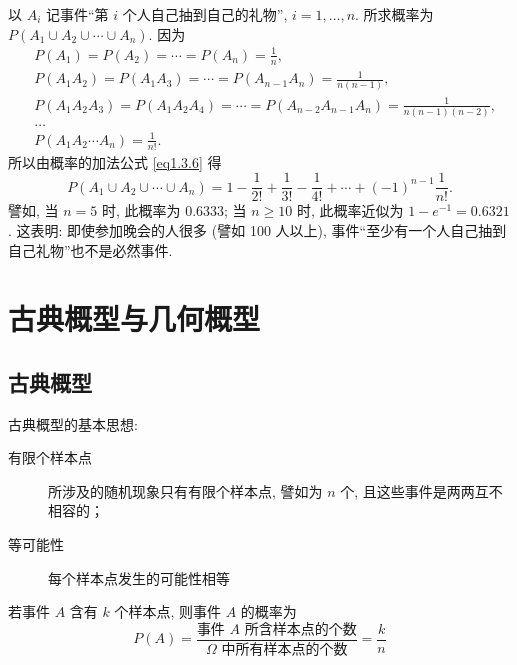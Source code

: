 \begin{solution}
    以 $A_i$ 记事件“第 $i$ 个人自己抽到自己的礼物”,
    $i=1,\dotsc,n$.
    所求概率为 $P(A_1 \cup A_2 \cup \dotsb \cup A_n)$.
    因为
    \begin{align*}
         & P(A_1) = P(A_2) = \dotsb = P(A_n) =\frac{1}{n},                                              \\
         & P(A_1 A_2) = P(A_1 A_3) = \dotsb = P(A_{n-1} A_n) = \frac{1}{n (n-1)},                       \\
         & P(A_1 A_2 A_3) = P(A_1 A_2 A_4) = \dotsb = P(A_{n-2} A_{n-1} A_n) = \frac{1}{n (n-1) (n-2)}, \\
         & \ldots                                                                                       \\
         & P(A_1 A_2 \dotsb A_n) = \frac{1}{n!}.
    \end{align*}
    所以由概率的加法公式 \eqref{eq1.3.6} 得
    \[
        P(A_1 \cup A_2 \cup \dotsb \cup A_n) = 1 - \frac{1}{2!} + \frac{1}{3!} - \frac{1}{4!} + \dotsb + (-1)^{n-1} \frac{1}{n!}.
    \]
    譬如,
    当 $n=5$ 时,
    此概率为 \num{0.6333};
    当 $n \ge 10$ 时,
    此概率近似为 $1 - e^{-1} = 0.6321$.
    这表明:
    即使参加晚会的人很多 (譬如 100 人以上),
    事件“至少有一个人自己抽到自己礼物”也不是必然事件.
\end{solution}

\section{古典概型与几何概型}

\subsection{古典概型}

古典概型的基本思想:
\begin{description}
    \item[有限个样本点] 所涉及的随机现象只有有限个样本点, 譬如为 $n$ 个, 且这些事件是两两互不相容的；
    \item[等可能性] 每个样本点发生的可能性相等
\end{description}

\begin{definition}[古典概型]
    若事件 $A$ 含有 $k$ 个样本点, 则事件 $A$ 的概率为
    \[  P (A) = \frac{\text{事件 } A \text{ 所含样本点的个数}}{\Omega \text{ 中所有样本点的个数}} = \frac{k}{n} \]
\end{definition}

